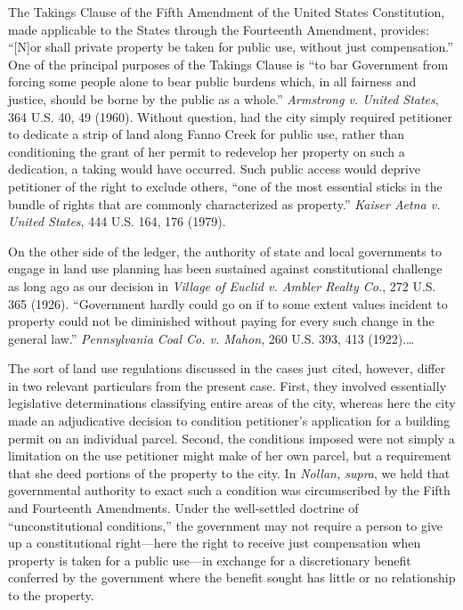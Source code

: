 The Takings Clause of the Fifth Amendment of the United States Constitution,
made applicable to the States through the Fourteenth Amendment, provides:
``[N]or shall private property be taken for public use, without just
compensation.'' One of the principal purposes of the Takings Clause is ``to bar
Government from forcing some people alone to bear public burdens which, in all
fairness and justice, should be borne by the public as a whole.''
\textit{Armstrong v. United States}, 364 U.S. 40, 49 (1960). Without question,
had the city simply required petitioner to dedicate a strip of land along Fanno
Creek for public use, rather than conditioning the grant of her permit to
redevelop her property on such a dedication, a taking would have occurred. Such
public access would deprive petitioner of the right to exclude others, ``one of
the most essential sticks in the bundle of rights that are commonly
characterized as property.'' \textit{Kaiser Aetna v. United States}, 444 U.S.
164, 176 (1979).

On the other side of the ledger, the authority of state and local governments to
engage in land use planning has been sustained against constitutional challenge
as long ago as our decision in \textit{Village of Euclid v. Ambler Realty Co.},
272 U.S. 365 (1926). ``Government hardly could go on if to some extent values
incident to property could not be diminished without paying for every such
change in the general law.'' \textit{Pennsylvania Coal Co. v. Mahon}, 260 U.S.
393, 413 (1922).\ldots

The sort of land use regulations discussed in the cases just cited, however,
differ in two relevant particulars from the present case. First, they involved
essentially legislative determinations classifying entire areas of the city,
whereas here the city made an adjudicative decision to condition petitioner's
application for a building permit on an individual parcel. Second, the
conditions imposed were not simply a limitation on the use petitioner might make
of her own parcel, but a requirement that she deed portions of the property to
the city. In \textit{Nollan, supra}, we held that governmental authority to
exact such a condition was circumscribed by the Fifth and Fourteenth Amendments.
Under the well-settled doctrine of ``unconstitutional conditions,'' the
government may not require a person to give up a constitutional right---here the
right to receive just compensation when property is taken for a public use---in
exchange for a discretionary benefit conferred by the government where the
benefit sought has little or no relationship to the property. 

